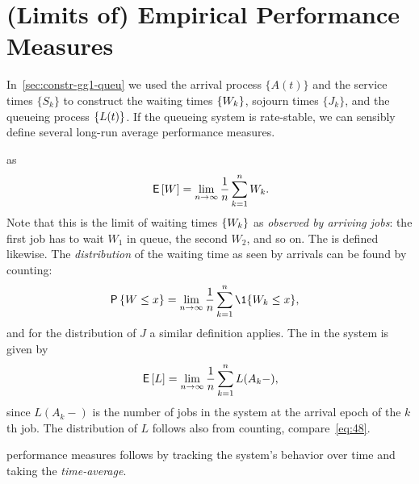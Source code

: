 
\section{(Limits of) Empirical Performance Measures}
\label{sec:limits-of-empirical}

In~\cref{sec:constr-gg1-queu} we used the arrival process $\{A(t)\}$ and the service times $\{S_k\}$ to construct the waiting times $\{W_k\}$, sojourn times $\{J_k\}$, and the queueing process $\{L(t)\}$. If the queueing system is rate-stable, we can sensibly define several long-run average performance measures.




  as
\begin{equation*}
 \,\mathsf{E}\left[W\right] = \lim_{n\to\infty} \frac 1 n\sum_{k=1}^n W_{k}.
\end{equation*}
Note that this is the limit of waiting times $\{W_k\}$ as \emph{observed by arriving jobs}:
 the first job has to wait $W_1$ in queue, the second $W_2$, and so on.
The  is defined likewise.
The \emph{distribution} of the waiting time as seen by arrivals can be found by counting:
\begin{align}\label{eq:48}
 \P{\W \leq x} &= \lim_{n\to\infty} \frac 1n\sum_{k=1}^n \1{\W_k\leq x},
\end{align}
and for the distribution of $J$  a similar definition applies.
The  in the system is given by
\begin{equation}\label{eq:EQ}
\,\mathsf{E}\left[L\right] = \lim_{n\to\infty}\frac 1 n \sum_{k=1}^n L(A_k-),
\end{equation}
since $L(A_k-)$ is the number of jobs in the system at the arrival epoch of the $k$th job.
The distribution of $L$ follows also from counting, compare~\cref{eq:48}.


 performance measures follows by tracking the system's behavior over time and taking the \emph{time-average}.

